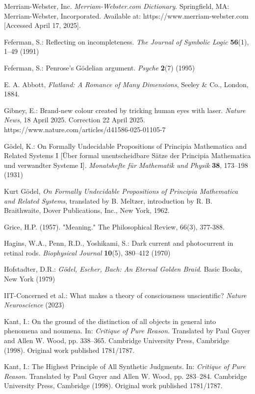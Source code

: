 \documentclass[runningheads]{llncs}
\begin{document}
\begin{thebibliography}{99}
 Merriam-Webster, Inc. \emph{Merriam-Webster.com Dictionary}. Springfield, MA: Merriam-Webster, Incorporated. Available at: https://www.merriam-webster.com [Accessed April 17, 2025].

 Feferman, S.: Reflecting on incompleteness. \emph{The Journal of Symbolic Logic} \textbf{56}(1), 1--49 (1991)

 Feferman, S.: Penrose's Gödelian argument. \emph{Psyche} \textbf{2}(7) (1995)

 E. A. Abbott, \emph{Flatland: A Romance of Many Dimensions}, Seeley \& Co., London, 1884.

 Gibney, E.: Brand-new colour created by tricking human eyes with laser. \emph{Nature News}, 18 April 2025. Correction 22 April 2025. https://www.nature.com/articles/d41586-025-01105-7

 Gödel, K.: On Formally Undecidable Propositions of Principia Mathematica and Related Systems I [Über formal unentscheidbare Sätze der Principia Mathematica und verwandter Systeme I]. \emph{Monatshefte für Mathematik und Physik} \textbf{38}, 173--198 (1931)

 Kurt Gödel, \emph{On Formally Undecidable Propositions of Principia Mathematica and Related Systems}, translated by B. Meltzer, introduction by R. B. Braithwaite, Dover Publications, Inc., New York, 1962.

 Grice, H.P. (1957). "Meaning." The Philosophical Review, 66(3), 377-388.

 Hagins, W.A., Penn, R.D., Yoshikami, S.: Dark current and photocurrent in retinal rods. \emph{Biophysical Journal} \textbf{10}(5), 380--412 (1970)

 Hofstadter, D.R.: \emph{Gödel, Escher, Bach: An Eternal Golden Braid}. Basic Books, New York (1979)

 IIT-Concerned et al.: What makes a theory of consciousness unscientific? \emph{Nature Neuroscience} (2023)

 Kant, I.: On the ground of the distinction of all objects in general into phenomena and noumena. In: \emph{Critique of Pure Reason}. Translated by Paul Guyer and Allen W. Wood, pp. 338--365. Cambridge University Press, Cambridge (1998). Original work published 1781/1787.

 Kant, I.: The Highest Principle of All Synthetic Judgments. In: \emph{Critique of Pure Reason}. Translated by Paul Guyer and Allen W. Wood, pp. 283--284. Cambridge University Press, Cambridge (1998). Original work published 1781/1787.


\end{thebibliography}
\end{document}
